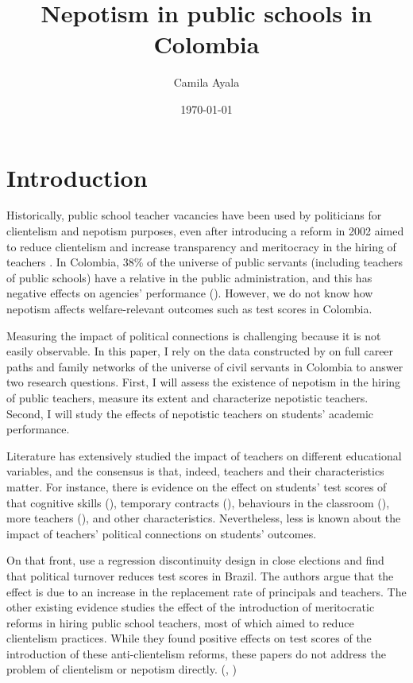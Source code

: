 \documentclass[12pt,runningheads]{article}
\title{Nepotism in public schools in Colombia}
\author{Camila Ayala}
\date{\today}
\begin{document}
\maketitle

\section{Introduction} 

Historically, public school teacher vacancies have been used by politicians for clientelism and nepotism purposes, even after introducing a reform in 2002 aimed to reduce clientelism and increase transparency and meritocracy in the hiring of teachers \citep{duarte2001politica, eaton2014teachers}. In Colombia, 38\% of the universe of public servants (including teachers of public schools) have a relative in the public administration, and this has negative effects on agencies' performance (\cite{Riano2021}). However, we do not know how nepotism affects welfare-relevant outcomes such as test scores in Colombia.

Measuring the impact of political connections is challenging because it is not easily observable. In this paper, I rely on the data constructed by \cite{Riano2021} on full career paths and family networks of the universe of civil servants in Colombia to answer two research questions. First, I will assess the existence of nepotism in the hiring of public teachers, measure its extent and characterize nepotistic teachers. Second, I will study the effects of nepotistic teachers on students' academic performance.

Literature has extensively studied the impact of teachers on different educational variables, and the consensus is that, indeed, teachers and their characteristics matter. For instance, there is evidence on the effect on students' test scores of that cognitive skills (\cite{hanushek2019value}), temporary contracts (\cite{muralidharan2013contract}), behaviours in the classroom (\cite{araujo2016}), more teachers (\cite{kremer2009}), and other characteristics. Nevertheless, less is known about the impact of teachers' political connections on students' outcomes. 

On that front, \cite{akhtari2022} use a regression discontinuity design in close elections and find that political turnover reduces test scores in Brazil. The authors argue that the effect is due to an increase in the replacement rate of principals and teachers. The other existing evidence studies the effect of the introduction of meritocratic reforms in hiring public school teachers, most of which aimed to reduce clientelism practices. While they found positive effects on test scores of the introduction of these anti-clientelism reforms, these papers do not address the problem of clientelism or nepotism directly. (\cite{estrada2019}, \cite{brutti2022})
\end{document}
